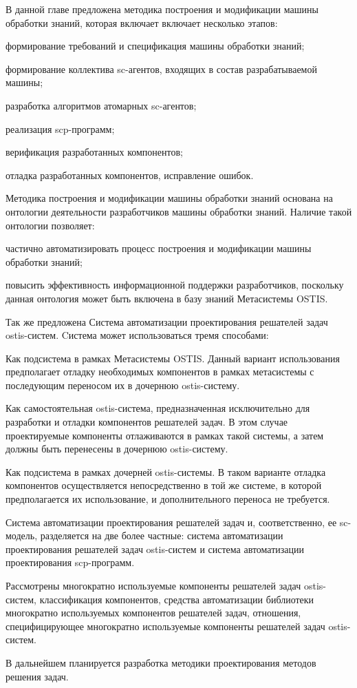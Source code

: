 В данной главе предложена методика построения и модификации машины обработки знаний, которая включает включает несколько этапов:
\begin{textitemize}
    \item формирование требований и спецификация машины обработки знаний;
    \item формирование коллектива sc-агентов, входящих в состав разрабатываемой машины;
    \item разработка алгоритмов атомарных sc-агентов;
    \item реализация scp-программ;
    \item верификация разработанных компонентов;
    \item отладка разработанных компонентов, исправление ошибок.
\end{textitemize}
Методика построения и модификации машины обработки знаний основана на онтологии деятельности разработчиков машины обработки знаний. Наличие такой онтологии позволяет:
\begin{textitemize}
    \item частично автоматизировать процесс построения и модификации машины обработки знаний;
    \item повысить эффективность информационной поддержки разработчиков, поскольку данная онтология может быть включена в базу знаний Метасистемы OSTIS.
\end{textitemize}
Так же предложена Система автоматизации проектирования решателей задач ostis-систем. Cистема может использоваться тремя способами:
\begin{textitemize}
    \item Как подсистема в рамках Метасистемы OSTIS. Данный вариант использования предполагает отладку необходимых компонентов в рамках метасистемы с последующим переносом их в дочернюю ostis-систему.
    \item Как самостоятельная ostis-система, предназначенная исключительно для разработки и отладки компонентов решателей задач. В этом случае проектируемые компоненты отлаживаются в рамках такой системы, а затем должны быть перенесены в дочернюю ostis-систему.
    \item Как подсистема в рамках дочерней ostis-системы. В таком варианте отладка компонентов осуществляется непосредственно в той же системе, в которой предполагается их использование, и дополнительного переноса не требуется.
\end{textitemize}
Система автоматизации проектирования решателей задач и, соответственно, ее sc-модель, разделяется на две более частные: система автоматизации проектирования решателей задач ostis-систем и система автоматизации проектирования scp-программ.

Рассмотрены многократно используемые компоненты решателей задач ostis-систем, классификация компонентов, средства автоматизации библиотеки многократно используемых компонентов решателей задач, отношения, специфицирующее многократно используемые компоненты решателей задач ostis-систем.

В дальнейшем планируется разработка методики проектирования методов решения задач.

%